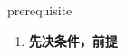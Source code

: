 
\begin{frame}
{\huge prerequisite}
\begin{center}
\begin{enumerate}\Large
  \item \textbf{先决条件，前提}
\end{enumerate}
\end{center}
\end{frame}
